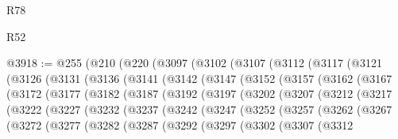 \begin{lexlean}{R78}
\begin{lexlean}{R52}
\begin{coremodule}
{{{{{{{{{{{{{{{{{{{{{{{{{{{{{{{{{{{{{{{{{{{{{{{{{{{{{{{{{{{{{{{{{{{{{{{{{{{{{{{{{{{{{{{{{{{{{{{{{{{{{{{{{{{{{{{{{{{{{{{{{{{{{{{{{{{{{{{{{{{{{{{{{{{{{{{{{{{{{{{{{{{{{{{{{{{{{{{{{{{{{{{{{{{{{{{{{{{{{{@3918 := @255
    (@210
      (@220
        (@3097
          (@3102
            (@3107
              (@3112
                (@3117
                  (@3121
                    (@3126
                      (@3131
                        (@3136
                          (@3141
                            (@3142
                              (@3147
                                (@3152
                                  (@3157
                                    (@3162
                                      (@3167
                                        (@3172
                                          (@3177
                                            (@3182
                                              (@3187
                                                (@3192
                                                  (@3197
                                                    (@3202
                                                      (@3207
                                                        (@3212
                                                          (@3217
                                                            (@3222
                                                              (@3227
                                                                (@3232
                                                                  (@3237
                                                                    (@3242
                                                                      (@3247
                                                                        (@3252
                                                                          (@3257
                                                                            (@3262
                                                                              (@3267
                                                                                (@3272
                                                                                  (@3277
                                                                                    (@3282
                                                                                      (@3287
                                                                                        (@3292
                                                                                          (@3297
                                                                                            (@3302
                                                                                              (@3307
                                                                                                (@3312
}}}}}}}}}}}}}}}}}}}}}}}}}}}}}}}}}}}}}}}}}}}}}}}}}}}}}}}}}}}}}}}}}}}}}}}}}}}}}}}}}}}}}}}}}}}}}}}}}}}}}}}}}}}}}}}}}}}}}}}}}}}}}}}}}}}}}}}}}}}}}}}}}}}}}}}}}}}}}}}}}}}}}}}}}}}}}}}}}}}}}}}}}}}}}}}}}}}}}}
\end{coremodule}
\end{lexlean}
\end{lexlean}
